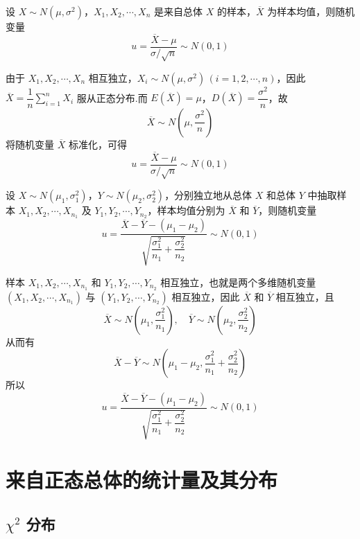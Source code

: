 \begin{theorem} \label{theorem:正态总体的样本均值服从正态分布}
    设 $X \sim N(\mu, \sigma^2)$，$X_1, X_2, \cdots, X_n$ 是来自总体 $X$ 的样本，$\overline{X}$ 为样本均值，则随机变量
    $$
    u = \dfrac{\overline{X} - \mu}{\sigma / \sqrt{n}} \sim N(0,1)
    $$
\end{theorem}

\begin{myproof}
    由于 $X_1, X_2, \cdots, X_n$ 相互独立，$X_i \sim N(\mu, \sigma^2) \, (i=1,2,\cdots,n)$，因此 $\overline{X} = \dfrac{1}{n} \displaystyle\sum_{i=1}^n X_i$ 服从正态分布.而 $E(\overline{X}) = \mu$，$D(\overline{X}) = \dfrac{\sigma^2}{n}$，故
    $$
    \overline{X} \sim N(\mu, \dfrac{\sigma^2}{n})
    $$
    将随机变量 $\overline{X}$ 标准化，可得
    $$
    u = \dfrac{\overline{X} - \mu}{\sigma / \sqrt{n}} \sim N(0,1)
    $$
\end{myproof}

\begin{theorem} \label{theorem:两个正太总体的样本均值}
    设 $X \sim N(\mu_1, \sigma_1^2)$，$Y \sim N(\mu_2, \sigma_2^2)$，分别独立地从总体 $X$ 和总体 $Y$ 中抽取样本 $X_1, X_2, \cdots, X_{n_1}$ 及 $Y_1, Y_2, \cdots, Y_{n_2}$，样本均值分别为 $\overline{X}$ 和 $\overline{Y}$，则随机变量
    $$
    u = \dfrac{\overline{X} - \overline{Y} - (\mu_1 - \mu_2)}{\sqrt{\dfrac{\sigma_1^2}{n_1} + \dfrac{\sigma_2^2}{n_2}}} \sim N(0,1)
    $$
\end{theorem}

\begin{myproof}
    样本 $X_1, X_2, \cdots, X_{n_1}$ 和 $Y_1, Y_2, \cdots, Y_{n_2}$ 相互独立，也就是两个多维随机变量 $(X_1, X_2, \cdots, X_{n_1})$ 与 $(Y_1, Y_2, \cdots, Y_{n_2})$ 相互独立，因此 $\overline{X}$ 和 $\overline{Y}$ 相互独立，且
    $$
    \overline{X} \sim N(\mu_1, \dfrac{\sigma_1^2}{n_1}), \quad \overline{Y} \sim N(\mu_2, \dfrac{\sigma_2^2}{n_2})
    $$
    从而有
    $$
    \overline{X} - \overline{Y} \sim N(\mu_1 - \mu_2, \dfrac{\sigma_1^2}{n_1} + \dfrac{\sigma_2^2}{n_2})
    $$
    所以
    $$
    u = \dfrac{\overline{X} - \overline{Y} - (\mu_1 - \mu_2)}{\sqrt{\dfrac{\sigma_1^2}{n_1} + \dfrac{\sigma_2^2}{n_2}}} \sim N(0,1)
    $$
\end{myproof}

\section{来自正态总体的统计量及其分布}

\subsection{\texorpdfstring{$\chi^2$}{} 分布}

